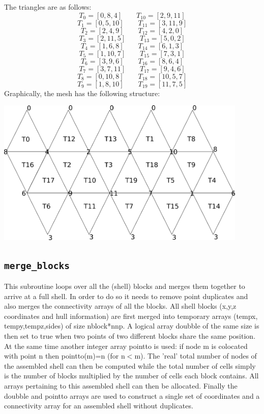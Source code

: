 The triangles are as follows:
 \[  T_0=[0,8,4]  \quad\quad T_{10}=[2,9,11]   \]
 \[  T_1=[0,5,10] \quad\quad T_{11}=[3,11,9]   \]
 \[  T_2=[2,4,9]  \quad\quad T_{12}=[4,2,0]   \]
 \[  T_3=[2,11,5] \quad\quad T_{13}=[5,0,2]   \]
 \[  T_4=[1,6,8]  \quad\quad T_{14}=[6,1,3]   \]
 \[  T_5=[1,10,7] \quad\quad T_{15}=[7,3,1]   \]
 \[  T_6=[3,9,6]  \quad\quad T_{16}=[8,6,4]   \]
 \[  T_7=[3,7,11] \quad\quad T_{17}=[9,4,6]   \]
 \[  T_8=[0,10,8] \quad\quad T_{18}=[10,5,7]   \]
 \[  T_9=[1,8,10] \quad\quad T_{19}=[11,7,5]   \]
 Graphically, the mesh has the following structure:
 \begin{center}
 \includegraphics[width=12cm]{images/flat_icosahedron}
 \end{center}
 \subsection{\tt merge\_blocks}
 This subroutine loops over all the (shell) blocks and merges them together to 
 arrive at a full shell. In order to do so it needs to remove point duplicates 
 and also merges the connectivity arrays of all the blocks.
 All shell blocks (x,y,z coordinates and hull information) are first merged 
 into temporary arrays (tempx, tempy,tempz,sides) of size nblock*nnp.
 A logical array doubble of the same size is then set to true when two points 
 of two different blocks share the same position. At the same time 
 another integer array pointto is used: if node m is colocated with point n then 
 pointto(m)=n (for n$<$m).
 The 'real' total number of nodes of the assembled shell can then be computed while
 the total number of cells simply is the number of blocks multiplied by the 
 number of cells each block contains.
 All arrays pertaining to this assembled shell can then be allocated. 
 Finally the doubble and pointto arrays are used to construct a single set of coordinates and 
 a connectivity array for an assembled shell without duplicates. 
